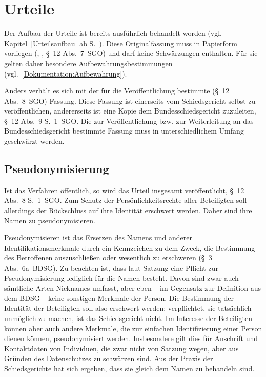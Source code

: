 \section{Urteile}
\label{Dokumentation:Urteile}
Der Aufbau der Urteile ist bereits ausführlich behandelt worden (vgl. Kapitel~\ref{Urteilsaufbau} ab S.~\pageref{Urteilsaufbau}).
Diese Originalfassung muss in Papierform vorliegen (, , \S~12 Abs.~7~SGO) und darf keine Schwärzungen enthalten.
Für sie gelten daher besondere Aufbewahrungsbestimmungen (vgl.~\ref{Dokumentation:Aufbewahrung}).

Anders verhält es sich mit der für die Veröffentlichung bestimmte (\S~12 Abs.~8~SGO) Fassung.
Diese Fassung ist einerseits vom Schiedsgericht selbst zu veröffentlichen, andererseits ist eine Kopie dem Bundesschiedsgericht zuzuleiten, \S~12 Abs.~9 S.~1~SGO.
Die zur Veröffentlichung bzw. zur Weiterleitung an das Bundesschiedsgericht bestimmte Fassung muss in unterschiedlichem Umfang geschwärzt werden.

\subsection{Pseudonymisierung}
\label{Dokumentation:Urteile:Pseudonymisierung}
Ist das Verfahren öffentlich, so wird das Urteil insgesamt veröffentlicht, \S~12 Abs.~8 S.~1~SGO.
Zum Schutz der Persönlichkeitsrechte aller Beteiligten soll allerdings der Rückschluss auf ihre Identität erschwert werden.
Daher sind ihre Namen zu pseudonymisieren.

Pseudonymisieren ist das Ersetzen des Namens und anderer Identifikationsmerkmale durch ein Kennzeichen zu dem Zweck, die Bestimmung des Betroffenen auszuschließen oder wesentlich zu erschweren (\S~3 Abs.~6a~BDSG).
Zu beachten ist, dass laut Satzung eine Pflicht zur Pseudonymisierung lediglich für die Namen besteht.
Davon sind zwar auch sämtliche Arten Nicknames umfasst, aber eben -- im Gegensatz zur Definition aus dem BDSG -- keine sonstigen Merkmale der Person.
Die Bestimmung der Identität der Beteiligten soll also erschwert werden; verpflichtet, sie tatsächlich unmöglich zu machen, ist das Schiedsgericht nicht.
Im Interesse der Beteiligten können aber auch andere Merkmale, die zur einfachen Identifizierung einer Person dienen können, pseudonymisiert werden.
Insbesondere gilt dies für Anschrift und Kontaktdaten von Individuen, die zwar nicht von Satzung wegen, aber aus Gründen des Datenschutzes zu schwärzen sind.
Aus der Praxis der Schiedsgerichte hat sich ergeben, dass sie gleich dem Namen zu behandeln sind. 

